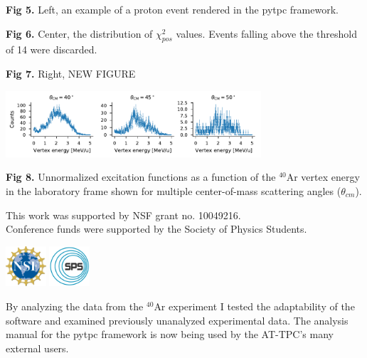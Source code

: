 \documentclass[ansiepaperDNP,portrait]{baposter}
\begin{document}
\begin{poster}
{\small{\textbf{Fig 5.} Left, an example of a proton event rendered in the pytpc framework.}

\small{\textbf{Fig 6.} Center, the distribution of $\chi_{pos}^{2}$ values. Events falling above the threshold of 14 were discarded.}

\small{\textbf{Fig 7.} Right, NEW FIGURE}

\begin{center}
\includegraphics [width=95mm] {angular_excitation_hists_POSTER.pdf}
\end{center}
\small{\textbf{Fig 8.} Unnormalized excitation functions as a function of the $^{40}$Ar vertex energy in the laboratory frame shown for multiple center-of-mass scattering angles ($\theta_{cm}$).}
}

{\small{This work was supported by NSF grant no. 10049216.\\ Conference funds were supported by the Society of Physics Students.
}

\includegraphics[height=15mm]{nsf_logo.png}
\hspace{.75cm}
\includegraphics [height=15mm]{sps_logo.png}


}
{\small{By analyzing the data from the $^{40}$Ar experiment I tested the adaptability of the software and examined previously unanalyzed experimental data. The analysis manual for the pytpc framework is now being used by the AT-TPC's many external users.

}}
\end{poster}
\end{document}
